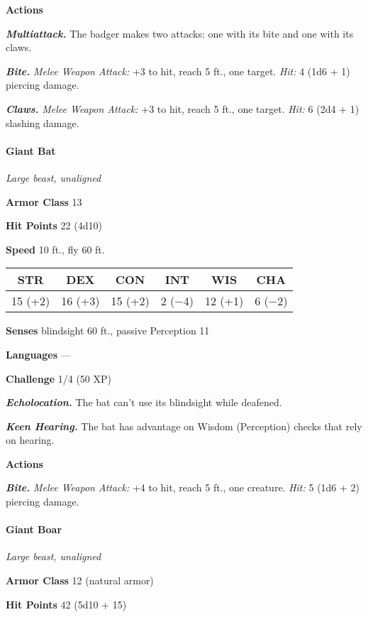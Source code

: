 \documentclass[
]{article}
\begin{document}
\textbf{Actions}

\emph{\textbf{Multiattack.}} The badger makes two attacks: one with its
bite and one with its claws.

\emph{\textbf{Bite.}} \emph{Melee Weapon Attack:} +3 to hit, reach 5
ft., one target. \emph{Hit:} 4 (1d6 + 1) piercing damage.

\emph{\textbf{Claws.}} \emph{Melee Weapon Attack:} +3 to hit, reach 5
ft., one target. \emph{Hit:} 6 (2d4 + 1) slashing damage.

\hypertarget{giant-bat}{%
\paragraph{Giant Bat}\label{giant-bat}}

\emph{Large beast, unaligned}

\textbf{Armor Class} 13

\textbf{Hit Points} 22 (4d10)

\textbf{Speed} 10 ft., fly 60 ft.

\begin{longtable}[]{@{}cccccc@{}}
\toprule
STR & DEX & CON & INT & WIS & CHA\tabularnewline
\midrule
\endhead
15 (+2) & 16 (+3) & 15 (+2) & 2 (−4) & 12 (+1) & 6 (−2)\tabularnewline
\bottomrule
\end{longtable}

\textbf{Senses} blindsight 60 ft., passive Perception 11

\textbf{Languages} ---

\textbf{Challenge} 1/4 (50 XP)

\emph{\textbf{Echolocation.}} The bat can't use its blindsight while
deafened.

\emph{\textbf{Keen Hearing.}} The bat has advantage on Wisdom
(Perception) checks that rely on hearing.

\textbf{Actions}

\emph{\textbf{Bite.}} \emph{Melee Weapon Attack:} +4 to hit, reach 5
ft., one creature. \emph{Hit:} 5 (1d6 + 2) piercing damage.

\hypertarget{giant-boar}{%
\paragraph{Giant Boar}\label{giant-boar}}

\emph{Large beast, unaligned}

\textbf{Armor Class} 12 (natural armor)

\textbf{Hit Points} 42 (5d10 + 15)
\end{document}
